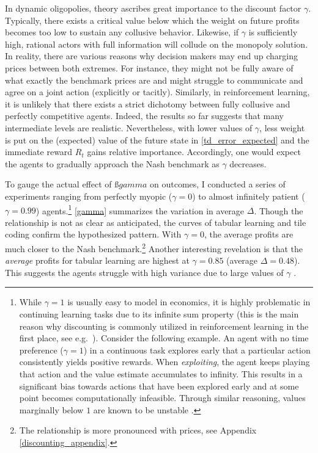 In dynamic oligopolies, theory ascribes great importance to the discount factor $\gamma$. Typically, there exists a critical value below which the weight on future profits becomes too low to sustain any collusive behavior. Likewise, if $\gamma$ is sufficiently high, rational actors with full information will collude on the monopoly solution. In reality, there are various reasons why decision makers may end up charging prices between both extremes. For instance, they might not be fully aware of what exactly the benchmark prices are and might struggle to communicate and agree on a joint action (explicitly or tacitly). Similarly, in reinforcement learning, it is unlikely that there exists a strict dichotomy between fully collusive and perfectly competitive agents. Indeed, the results so far suggests that many intermediate levels are realistic. Nevertheless, with lower values of $\gamma$, less weight is put on the (expected) value of the future state in \autoref{td_error_expected} and the immediate reward $R_t$ gains relative importance. Accordingly, one would expect the agents to gradually approach the Nash benchmark as $\gamma$ decreases.

To gauge the actual effect of $ßgamma$ on outcomes, I conducted a series of experiments ranging from perfectly myopic ($\gamma =0$) to almost infinitely patient ($\gamma = 0.99$) agents.\footnote{While $\gamma = 1$ is usually easy to model in economics, it is highly problematic in continuing learning tasks due to its infinite sum property (this is the main reason why discounting is commonly utilized in reinforcement learning in the first place, see e.g.\ \textcite[p.3]{schwartz_reinforcement_1993}). Consider the following example. An agent with no time preference ($\gamma = 1$) in a continuous task explores  early that a particular action consistently yields positive rewards. When \emph{exploiting}, the agent keeps playing that action and the value estimate accumulates to infinity. This results in a significant bias towards actions that have been explored early and at some point becomes computationally infeasible. Through similar reasoning, values marginally below $1$ are known to be unstable \parencite{naik_discounted_2019}.} \autoref{gamma} summarizes the variation in average $\Delta$. Though the relationship is not as clear as anticipated, the curves of tabular learning and tile coding confirm the hypothesized pattern. With $\gamma = 0$, the average profits are much closer to the Nash benchmark.\footnote{The relationship is more pronounced with prices, see Appendix \ref{discounting_appendix}.} Another interesting revelation is that the \emph{average} profits for tabular learning are highest at $\gamma = 0.85$ (average $\Delta = 0.48$). This suggests the agents struggle with high variance due to large values of $\gamma$ \parencite[p.6]{naik_discounted_2019}.

